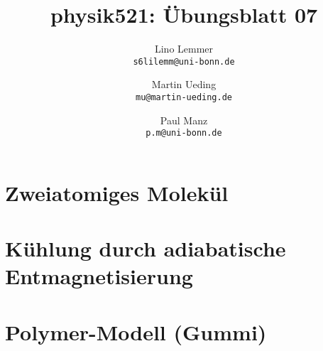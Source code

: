 

\setcounter{section}{0}
\renewcommand\thesection{H\,7.\arabic{section}}
\renewcommand\thesubsection{\thesection.\alph{subsection}}

\title{physik521: Übungsblatt 07}
\author{%
    Lino Lemmer \\ \small{\texttt{s6lilemm@uni-bonn.de}}
    \and
    Martin Ueding \\ \small{\texttt{mu@martin-ueding.de}}
    \and
    Paul Manz \\ \small{\texttt{p.m@uni-bonn.de}}
}


\maketitle
\section{Zweiatomiges Molekül}

\section{Kühlung durch adiabatische Entmagnetisierung}

\section{Polymer-Modell (Gummi)}



